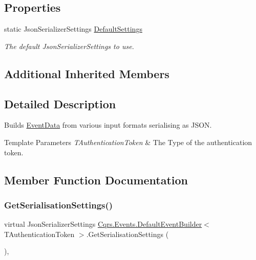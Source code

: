 \subsection*{Properties}
\begin{DoxyCompactItemize}
\item 
static Json\+Serializer\+Settings \hyperlink{classCqrs_1_1Events_1_1DefaultEventBuilder_aabead59863bacfed527d85ea789ab881_aabead59863bacfed527d85ea789ab881}{Default\+Settings}
\begin{DoxyCompactList}\small\item\em The default Json\+Serializer\+Settings to use. \end{DoxyCompactList}\end{DoxyCompactItemize}
\subsection*{Additional Inherited Members}


\subsection{Detailed Description}
Builds \hyperlink{classCqrs_1_1Events_1_1EventData}{Event\+Data} from various input formats serialising as J\+S\+ON. 


\begin{DoxyTemplParams}{Template Parameters}
{\em T\+Authentication\+Token} & The Type of the authentication token.\\
\hline
\end{DoxyTemplParams}


\subsection{Member Function Documentation}
\mbox{\label{classCqrs_1_1Events_1_1DefaultEventBuilder_a49be2758fa32166f1b95e8c0eb9355d1_a49be2758fa32166f1b95e8c0eb9355d1}} 
\subsubsection{\texorpdfstring{Get\+Serialisation\+Settings()}{GetSerialisationSettings()}}
{\footnotesize\ttfamily virtual Json\+Serializer\+Settings \hyperlink{classCqrs_1_1Events_1_1DefaultEventBuilder}{Cqrs.\+Events.\+Default\+Event\+Builder}$<$ T\+Authentication\+Token $>$.Get\+Serialisation\+Settings (\begin{DoxyParamCaption}{ }\end{DoxyParamCaption})\hspace{0.3cm}{\ttfamily [protected]}, {\ttfamily [virtual]}}




